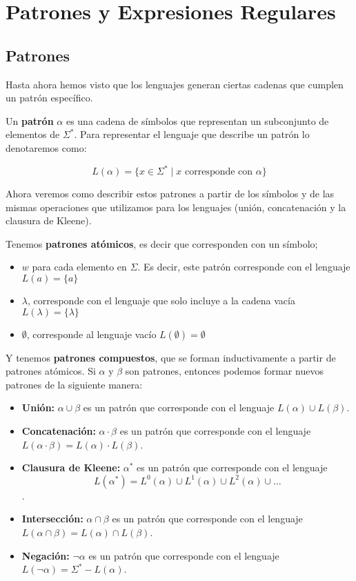 \section{Patrones y Expresiones Regulares}

\subsection{Patrones}

Hasta ahora hemos visto que los lenguajes generan ciertas cadenas que cumplen un patrón específico. 

\begin{Def}
Un \textbf{patrón} $\alpha$ es una cadena de símbolos que representan un subconjunto de elementos de $\Sigma^*$. Para
representar el lenguaje que describe un patrón lo denotaremos como: 

$$L(\alpha) = \{ x \in \Sigma^* \mid x \text{ corresponde con } \alpha\}$$

\end{Def}

Ahora veremos como describir estos patrones a partir de los símbolos y
de las mismas operaciones que utilizamos para los lenguajes (unión, concatenación y la clausura de Kleene). 

\begin{Def}
Tenemos \textbf{patrones atómicos}, es decir que corresponden con un símbolo;
\begin{itemize}
    \item $w$ para cada elemento en $\Sigma$. Es decir, este patrón corresponde con el lenguaje $L(a) = \{a\}$
    \item $\lambda$, corresponde con el lenguaje que solo incluye a la cadena vacía $L(\lambda) = \{\lambda\}$
    \item  $\emptyset$, corresponde al lenguaje vacío $L(\emptyset) = \emptyset$
\end{itemize}

Y tenemos \textbf{patrones compuestos}, que se forman inductivamente a partir de patrones atómicos.
Si $\alpha$ y $\beta$ son patrones, entonces podemos formar nuevos patrones de la siguiente manera:
\begin{itemize}
    \item \textbf{Unión:} $\alpha \cup \beta$ es un patrón que corresponde con el lenguaje $L(\alpha) \cup L(\beta)$.
    \item \textbf{Concatenación:} $\alpha \cdot \beta$ es un patrón que corresponde con el lenguaje $L(\alpha \cdot \beta) = L(\alpha) \cdot L(\beta)$.
    \item \textbf{Clausura de Kleene:} $\alpha^*$ es un patrón que corresponde con el lenguaje $$L(\alpha^*) = L^0(\alpha) \cup L^1(\alpha) \cup L^2(\alpha) \cup \ldots$$.
    \item \textbf{Intersección:} $\alpha \cap \beta$ es un patrón que corresponde con el lenguaje $L(\alpha \cap \beta) = L(\alpha) \cap L(\beta)$.
    \item \textbf{Negación:} $\neg \alpha$ es un patrón que corresponde con el lenguaje $L(\neg \alpha) = \Sigma^* - L(\alpha)$.
\end{itemize}
\end{Def}



